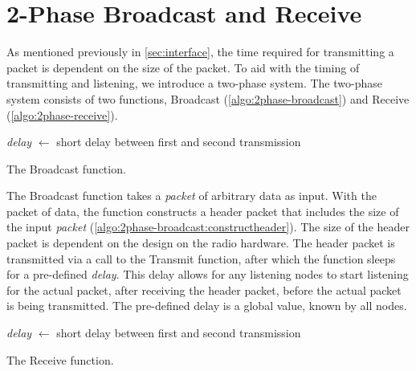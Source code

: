 \section{2-Phase Broadcast and Receive}\label{sec:2pcomm}
As mentioned previously in \autoref{sec:interface}, the time required for transmitting a packet is dependent
on the size of the packet. To aid with the timing of transmitting and listening, we introduce a two-phase
system. The two-phase system consists of two functions, Broadcast (\autoref{algo:2phase-broadcast}) and
Receive (\autoref{algo:2phase-receive}).

\begin{algorithm}[ht]
    \DontPrintSemicolon
    \textit{delay} $\leftarrow$ short delay between first and second transmission\;
    \;

    \caption{The Broadcast function.}
    \label{algo:2phase-broadcast}
\end{algorithm}

The Broadcast function takes a \textit{packet} of arbitrary data as input. With the packet of data, the
function constructs a header packet that includes the size of the input \textit{packet}
(\autoref{algo:2phase-broadcast:constructheader}). The size of the header packet is dependent on the design on
the radio hardware. The header packet is transmitted via a call to the Transmit function, after which the
function sleeps for a pre-defined \textit{delay}. This delay allows for any listening nodes to start listening
for the actual packet, after receiving the header packet, before the actual packet is being transmitted. The
pre-defined delay is a global value, known by all nodes.

\begin{algorithm}[ht]
    \DontPrintSemicolon
    \textit{delay} $\leftarrow$ short delay between first and second transmission\;
    \;

    \caption{The Receive function.}
    \label{algo:2phase-receive}
\end{algorithm}

